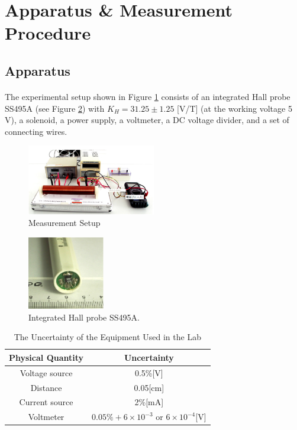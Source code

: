 \documentclass[a4paper]{article}
\begin{document}
    \section{Apparatus \& Measurement Procedure}
    \subsection{Apparatus}
    \paragraph{}The experimental setup shown in Figure \ref{fig:measure} consists of an integrated Hall probe SS495A (see Figure \ref{fig:Shall}) with $K_H = 31.25 \pm 1.25$ [V/T] (at the working voltage 5 V), a solenoid, a power supply, a voltmeter, a DC voltage divider, and a set of connecting wires.
    \begin{figure}[H]
        \centering
        \includegraphics[width=0.5\textwidth]{fig/measurement.png}
        \caption{Measurement Setup}
        \label{fig:measure}
    \end{figure}
    \begin{figure}[H]
        \centering
        \includegraphics[width=0.3\textwidth]{fig/Shall.jpg}
        \caption{Integrated Hall probe SS495A.}
        \label{fig:Shall}
    \end{figure}
    \begin{table}[H]
        \begin{center}
            \begin{tabular}{|c|c|}
                \hline
                Physical Quantity&Uncertainty\\\hline
                Voltage source&0.5\%[V]\\\hline
                Distance&0.05[cm]\\\hline
                Current source&2\%[mA]\\\hline
                Voltmeter&$0.05\%+6\times 10^{-3}\text{ or }6\times10^{-4}$[V]\\\hline
            \end{tabular}
            \caption{The Uncertainty of the Equipment Used in the Lab}
            \label{tab:uncertainty}
        \end{center}
    \end{table}
\end{document}
